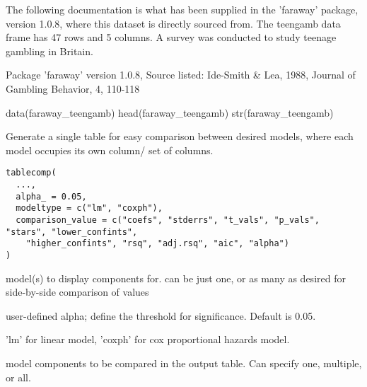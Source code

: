 \documentclass[a4paper]{book}
\begin{document}
%
\begin{Details}
The following documentation is what has been supplied in the 'faraway' package, version 1.0.8, where this dataset is directly sourced from. The teengamb data frame has 47 rows and 5 columns. A survey was conducted to study teenage gambling in Britain.
\end{Details}
%
\begin{Source}
Package 'faraway' version 1.0.8, Source listed: Ide-Smith \& Lea, 1988, Journal of Gambling Behavior, 4, 110-118
\end{Source}
%
\begin{Examples}
\begin{ExampleCode}
data(faraway_teengamb)
head(faraway_teengamb)
str(faraway_teengamb)
\end{ExampleCode}
\end{Examples}
%
\begin{Description}
Generate a single table for easy comparison between desired models, where each model occupies its own column/ set of columns.
\end{Description}
%
\begin{Usage}
\begin{verbatim}
tablecomp(
  ...,
  alpha_ = 0.05,
  modeltype = c("lm", "coxph"),
  comparison_value = c("coefs", "stderrs", "t_vals", "p_vals", "stars", "lower_confints",
    "higher_confints", "rsq", "adj.rsq", "aic", "alpha")
)
\end{verbatim}
\end{Usage}
%
\begin{Arguments}
\begin{ldescription}
\item[\code{...}] model(s) to display components for. can be just one, or as many as desired for side-by-side comparison of values

\item[\code{alpha\_}] user-defined alpha; define the threshold for significance. Default is 0.05.

\item[\code{modeltype}] 'lm' for linear model, 'coxph' for cox proportional hazards model.

\item[\code{comparison\_value}] model components to be compared in the output table. Can specify one, multiple, or all.
\end{ldescription}
\end{Arguments}
%
\end{document}
